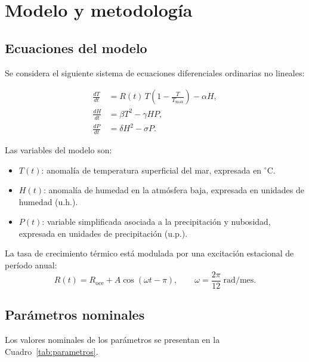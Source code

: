 \section{Modelo y metodología}

\subsection{Ecuaciones del modelo}
Se considera el siguiente sistema de ecuaciones diferenciales ordinarias no lineales: 

\begin{align}
    \frac{dT}{dt}
    &= R(t)\,T\left(1-\frac{T}{T_{\max}}\right)-\alpha H,
    \\
    \frac{dH}{dt}
    &= \beta T^2-\gamma HP,
    \\
    \frac{dP}{dt}
    &= \delta H^2-\sigma P.
\end{align}

Las variables del modelo son:
\begin{itemize}
    \item $T(t)$: anomalía de temperatura superficial del mar,
    expresada en ${}^{\circ}\mathrm{C}$.
    \item $H(t)$: anomalía de humedad en la atmósfera baja,
    expresada en unidades de humedad ($\mathrm{u.h.}$).
    \item $P(t)$: variable simplificada asociada a la precipitación
    y nubosidad, expresada en unidades de precipitación
    ($\mathrm{u.p.}$).
\end{itemize}
La tasa de crecimiento térmico está modulada por una excitación estacional de período anual:
\begin{equation}
    R(t)=R_{\mathrm{oce}}+A\cos(\omega t-\pi),
    \qquad
    \omega=\frac{2\pi}{12}\;\mathrm{rad/mes}.
\end{equation}

\subsection{Parámetros nominales}

Los valores nominales de los parámetros se presentan en la Cuadro~\ref{tab:parametros}.


